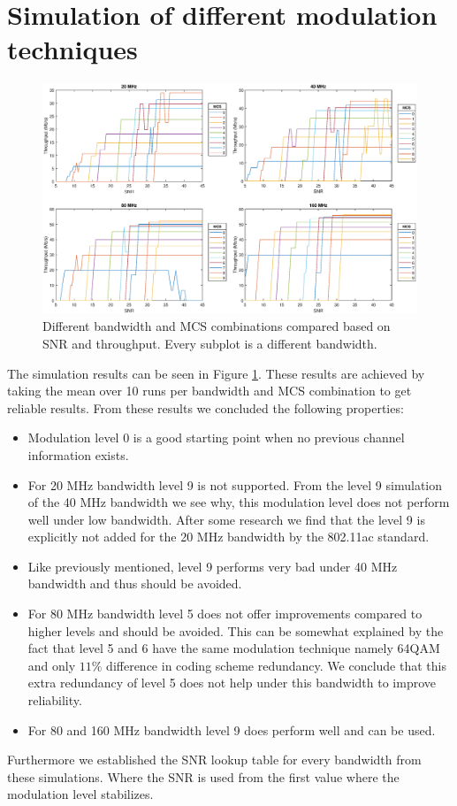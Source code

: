 \documentclass[a4paper]{article}
\begin{document}
\section{Simulation of different modulation techniques}
\begin{figure}[h]
\centering
\includegraphics[scale=0.5]{steponev2.eps}
\caption{Different bandwidth and MCS combinations compared based on SNR and throughput. Every subplot is a different bandwidth.}
\label{fig:stepone}
\end{figure}
 The simulation results can be seen in Figure \ref{fig:stepone}. These results are achieved by taking the mean over 10 runs per bandwidth and MCS combination to get reliable results. From these results we concluded the following properties:
 \begin{itemize}
     \item Modulation level 0 is a good starting point when no previous channel information exists.
     \item For 20 MHz bandwidth level 9 is not supported. From the level 9 simulation of the 40 MHz bandwidth we see why, this modulation level does not perform well under low bandwidth. After some research we find that the level 9 is explicitly not added for the 20 MHz bandwidth by the 802.11ac standard.
     \item Like previously mentioned, level 9 performs very bad under 40 MHz bandwidth and thus should be avoided.
     \item For 80 MHz bandwidth level 5 does not offer improvements compared to higher levels and should be avoided. This can be somewhat explained by the fact that level 5 and 6 have the same modulation technique namely 64QAM and only $11\%$ difference in coding scheme redundancy. We conclude that this extra redundancy of level 5 does not help under this bandwidth to improve reliability.
     \item For 80 and 160 MHz bandwidth level 9 does perform well and can be used.
 \end{itemize}
 Furthermore we established the SNR lookup table for every bandwidth from these simulations. Where the SNR is used from the first value where the modulation level stabilizes.
 
\end{document}
